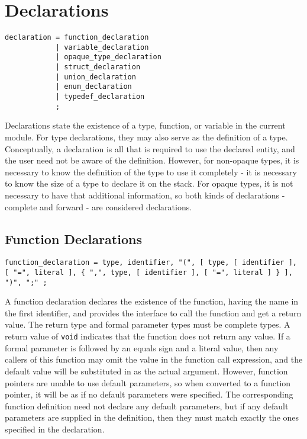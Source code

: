 \documentclass[letterpaper,12pt]{book}
\begin{document}
\chapter{Declarations}

\begin{lstlisting}[breaklines=true]
declaration = function_declaration
            | variable_declaration
            | opaque_type_declaration
            | struct_declaration
            | union_declaration
            | enum_declaration
            | typedef_declaration
            ;
\end{lstlisting}

Declarations state the existence of a type, function, or variable in the current module. For type declarations, they may also serve as the definition of a type. Conceptually, a declaration is all that is required to use the declared entity, and the user need not be aware of the definition. However, for non-opaque types, it is necessary to know the definition of the type to use it completely - it is necessary to know the size of a type to declare it on the stack. For opaque types, it is not necessary to have that additional information, so both kinds of declarations - complete and forward - are considered declarations.

\section{Function Declarations}

\begin{lstlisting}[breaklines=true]
function_declaration = type, identifier, "(", [ type, [ identifier ], [ "=", literal ], { ",", type, [ identifier ], [ "=", literal ] } ], ")", ";" ;
\end{lstlisting}

A function declaration declares the existence of the function, having the name in the first identifier, and provides the interface to call the function and get a return value. The return type and formal parameter types must be complete types. A return value of \texttt{void} indicates that the function does not return any value. If a formal parameter is followed by an equals sign and a literal value, then any callers of this function may omit the value in the function call expression, and the default value will be substituted in as the actual argument. However, function pointers are unable to use default parameters, so when converted to a function pointer, it will be as if no default parameters were specified. The corresponding function definition need not declare any default parameters, but if any default parameters are supplied in the definition, then they must match exactly the ones specified in the declaration.
\end{document}
